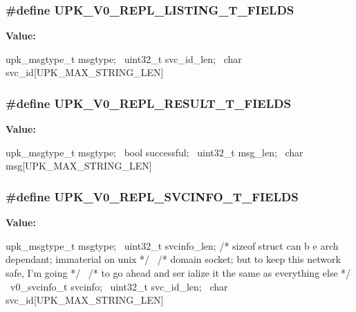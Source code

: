 \subsubsection[{UPK\_\-V0\_\-REPL\_\-LISTING\_\-T\_\-FIELDS}]{\setlength{\rightskip}{0pt plus 5cm}\#define UPK\_\-V0\_\-REPL\_\-LISTING\_\-T\_\-FIELDS}\label{upk__v0__protocol__structs_8h_aee0b588a5b3e1412db90ab95895943b1}
{\bfseries Value:}
\begin{DoxyCode}
upk_msgtype_t      msgtype; \
    uint32_t                svc_id_len; \
    char                    svc_id[UPK_MAX_STRING_LEN]
\end{DoxyCode}
\subsubsection[{UPK\_\-V0\_\-REPL\_\-RESULT\_\-T\_\-FIELDS}]{\setlength{\rightskip}{0pt plus 5cm}\#define UPK\_\-V0\_\-REPL\_\-RESULT\_\-T\_\-FIELDS}\label{upk__v0__protocol__structs_8h_ad5abcf74859bd06704710e3e4388ecff}
{\bfseries Value:}
\begin{DoxyCode}
upk_msgtype_t      msgtype; \
    bool                    successful; \
    uint32_t                msg_len; \
    char                    msg[UPK_MAX_STRING_LEN]
\end{DoxyCode}
\subsubsection[{UPK\_\-V0\_\-REPL\_\-SVCINFO\_\-T\_\-FIELDS}]{\setlength{\rightskip}{0pt plus 5cm}\#define UPK\_\-V0\_\-REPL\_\-SVCINFO\_\-T\_\-FIELDS}\label{upk__v0__protocol__structs_8h_ab493121b93a92c908be3b40c3d4520c7}
{\bfseries Value:}
\begin{DoxyCode}
upk_msgtype_t           msgtype; \
    uint32_t                svcinfo_len;                   /* sizeof struct can b
      e arch dependant; immaterial on unix */ \
                                                           /* domain socket; but 
      to keep this network safe, I'm going */ \
                                                           /* to go ahead and ser
      ialize it the same as everything else */ \
    v0_svcinfo_t            svcinfo; \
    uint32_t                svc_id_len; \
    char                    svc_id[UPK_MAX_STRING_LEN]
\end{DoxyCode}
